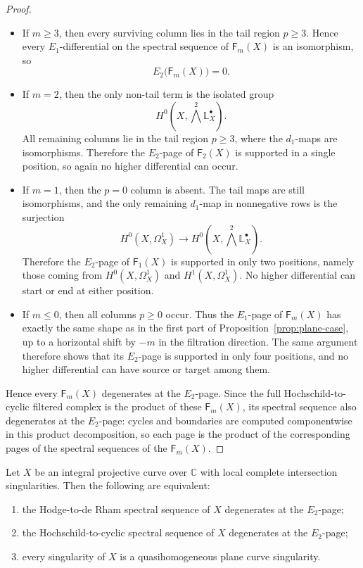 \documentclass[12pt,reqno]{amsart}
\begin{document}
\begin{proof}
\begin{itemize}
  \item If \(m\ge 3\), then every surviving column lies in the tail region \(p\ge 3\). Hence every \(E_1\)-differential on the spectral sequence of \(\mathsf F_m(X)\) is an isomorphism, so
  \[
    E_2\bigl(\mathsf F_m(X)\bigr)=0.
  \]
  \item If \(m=2\), then the only non-tail term is the isolated group
  \[
    H^0\!\left(X,\bigwedge^2\mathbb{L}^{\bullet}_X\right).
  \]
  All remaining columns lie in the tail region \(p\ge 3\), where the \(d_1\)-maps are isomorphisms. Therefore the \(E_2\)-page of \(\mathsf F_2(X)\) is supported in a single position, so again no higher differential can occur.
  \item If \(m=1\), then the \(p=0\) column is absent. The tail maps are still isomorphisms, and the only remaining \(d_1\)-map in nonnegative rows is the surjection
  \[
    H^0(X,\Omega_X^1)\longrightarrow H^0\!\left(X,\bigwedge^2\mathbb{L}^{\bullet}_X\right).
  \]
  Therefore the \(E_2\)-page of \(\mathsf F_1(X)\) is supported in only two positions, namely those coming from \(H^0(X,\Omega_X^1)\) and \(H^1(X,\Omega_X^1)\). No higher differential can start or end at either position.
  \item If \(m\le 0\), then all columns \(p\ge 0\) occur. Thus the \(E_1\)-page of
  \(\mathsf F_m(X)\) has exactly the same shape as in the first part of
  Proposition~\ref{prop:plane-case}, up to a horizontal shift by \(-m\) in the filtration direction. The same argument therefore shows that its \(E_2\)-page is supported in only four positions, and no higher differential can have source or target among them.
\end{itemize}
Hence every \(\mathsf F_m(X)\) degenerates at the \(E_2\)-page. Since the full Hochschild-to-cyclic filtered complex is the product of these \(\mathsf F_m(X)\), its spectral sequence also degenerates at the \(E_2\)-page: cycles and boundaries are computed componentwise in this product decomposition, so each page is the product of the corresponding pages of the spectral sequences of the \(\mathsf F_m(X)\).
\end{proof}

\begin{corollary}\label{cor:equiv-HdR-HC}
Let \(X\) be an integral projective curve over \(\mathbb C\) with local complete intersection
singularities. Then the following are equivalent:
\begin{enumerate}
\item the Hodge-to-de Rham spectral sequence of \(X\) degenerates at the \(E_2\)-page;
\item the Hochschild-to-cyclic spectral sequence of \(X\) degenerates at the \(E_2\)-page;
\item every singularity of \(X\) is a quasihomogeneous plane curve singularity.
\end{enumerate}
\end{corollary}
\end{document}
